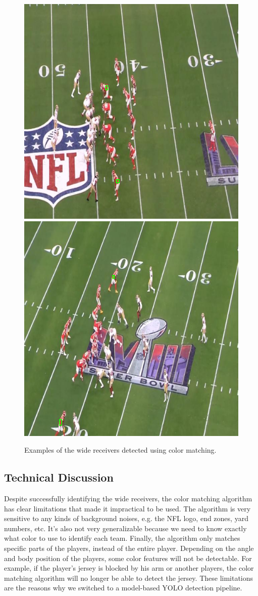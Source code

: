 \begin{figure}[t]
    \centering
    \includegraphics[width=0.4\linewidth]{color_matching_1.png}
    \includegraphics[width=0.4\linewidth]{color_matching_2.png}
    \caption{Examples of the wide receivers detected using color matching.}
    \label{fig:result2}
\end{figure}

\subsection{Technical Discussion}

Despite successfully identifying the wide receivers, the color matching algorithm has clear limitations that made it impractical to be used. The algorithm is very sensitive to any kinds of background noises, e.g. the NFL logo, end zones, yard numbers, etc. It's also not very generalizable because we need to know exactly what color to use to identify each team. Finally, the algorithm only matches specific parts of the players, instead of the entire player. Depending on the angle and body position of the players, some color features will not be detectable. For example, if the player’s jersey is blocked by his arm or another players, the color matching algorithm will no longer be able to detect the jersey. These limitations are the reasons why we switched to a model-based YOLO detection pipeline.

